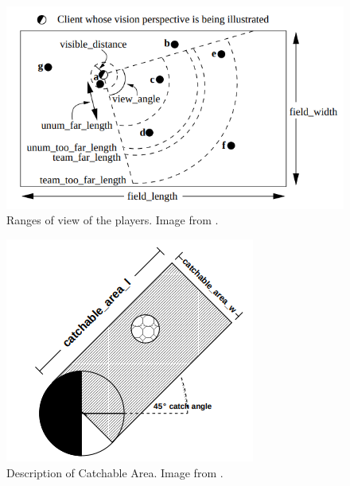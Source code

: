 \begin{figure}[H]
    \centering
    \includegraphics[scale=0.5]{images/view_ranges.png}
    \caption{Ranges of view of the players. Image from \cite{ss2dmanual}.}
    \label{fig:view_ranges}
\end{figure}

\begin{figure}[H]
    \centering
    \includegraphics[scale=0.5]{images/catchable_area.png}
    \caption{Description of Catchable Area. Image from \cite{ss2dmanual}.}
    \label{fig:catchable_area}
\end{figure}


